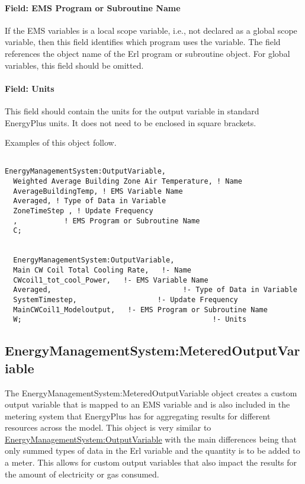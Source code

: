 \paragraph{Field: EMS Program or Subroutine Name}\label{field-ems-program-or-subroutine-name}

If the EMS variables is a local scope variable, i.e., not declared as a global scope variable, then this field identifies which program uses the variable. The field references the object name of the Erl program or subroutine object. For global variables, this field should be omitted.

\paragraph{Field: Units}\label{field-units}

This field should contain the units for the output variable in standard EnergyPlus units. It does not need to be enclosed in square brackets.

Examples of this object follow.

\begin{lstlisting}

EnergyManagementSystem:OutputVariable,
  Weighted Average Building Zone Air Temperature, ! Name
  AverageBuildingTemp, ! EMS Variable Name
  Averaged, ! Type of Data in Variable
  ZoneTimeStep , ! Update Frequency
  ,           ! EMS Program or Subroutine Name
  C;


  EnergyManagementSystem:OutputVariable,
  Main CW Coil Total Cooling Rate,   !- Name
  CWcoil1_tot_cool_Power,   !- EMS Variable Name
  Averaged,                               !- Type of Data in Variable
  SystemTimestep,                   !- Update Frequency
  MainCWCoil1_Modeloutput,   !- EMS Program or Subroutine Name
  W;                                             !- Units
\end{lstlisting}

\subsection{EnergyManagementSystem:MeteredOutputVariable}\label{energymanagementsystemmeteredoutputvariable}

The EnergyManagementSystem:MeteredOutputVariable object creates a custom output variable that is mapped to an EMS variable and is also included in the metering system that EnergyPlus has for aggregating results for different resources across the model. This object is very similar to \hyperref[energymanagementsystemoutputvariable]{EnergyManagementSystem:OutputVariable} with the main differences being that only summed types of data in the Erl variable and the quantity is to be added to a meter. This allows for custom output variables that also impact the results for the amount of electricity or gas consumed.

